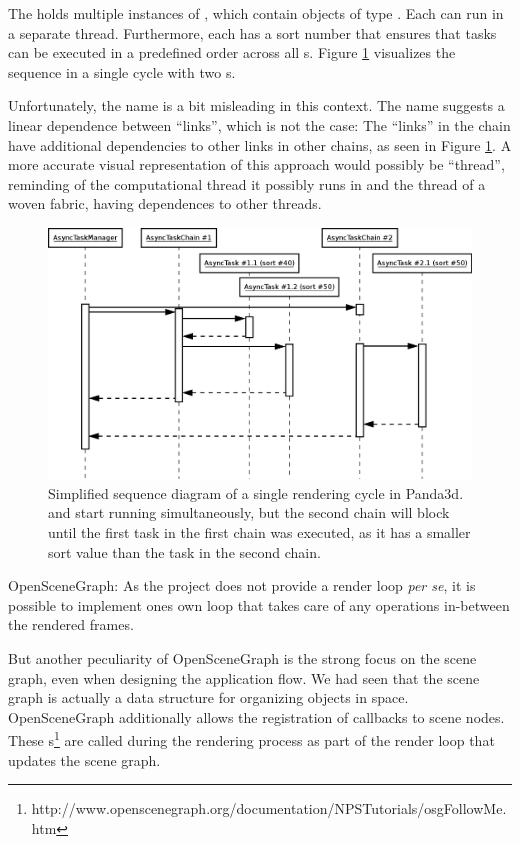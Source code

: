 \begin{biglist}
		The  holds multiple instances of , which contain objects of type . Each  can run in a separate thread. Furthermore, each  has a sort number that ensures that tasks can be executed in a predefined order across all s. Figure \ref{fig:PandaTasks} visualizes the sequence in a single cycle with two s.

		Unfortunately, the name  is a bit misleading in this context. The name suggests a linear dependence between ``links'', which is not the case: The ``links'' in the chain have additional dependencies to other links in other chains, as seen in Figure \ref{fig:PandaTasks}. A more accurate visual representation of this approach would possibly be ``thread'', reminding of the computational thread it possibly runs in and the thread of a woven fabric, having dependences to other threads.

		\begin{figure}[htbp]
			\centering
			\includegraphics[width=14cm]{images/PandaTasks.png}
			\caption{Simplified sequence diagram of a single rendering cycle in Panda3d.  and  start running simultaneously, but the second chain will block until the first task in the first chain was executed, as it has a smaller sort value than the task in the second chain.}
			\label{fig:PandaTasks}
		\end{figure}

		\item OpenSceneGraph: As the project does not provide a render loop \emph{per se}, it is possible to implement ones own loop that takes care of any operations in-between the rendered frames.
			
			But another peculiarity of OpenSceneGraph is the strong focus on the scene graph, even when designing the application flow. We had seen that the scene graph is actually a data structure for organizing objects in space. OpenSceneGraph additionally allows the registration of callbacks to scene nodes. These s\footnote{http://www.openscenegraph.org/documentation/NPSTutorials/osgFollowMe.htm} are called during the rendering process as part of the render loop that updates the scene graph.
		
	\end{biglist}


